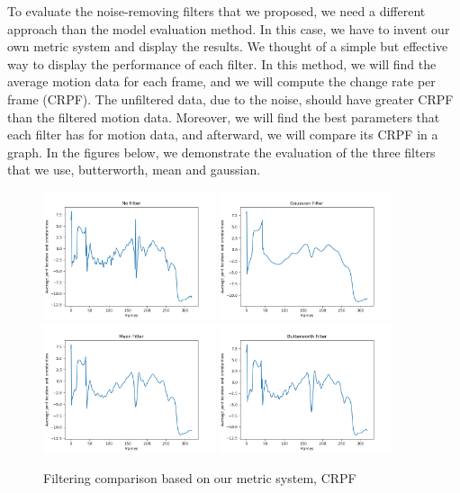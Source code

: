 To evaluate the noise-removing filters that we proposed, we need a different approach than the model evaluation method. In this case, we have to invent our own metric system and display the results. We thought of a simple but effective way to display the performance of each filter. In this method, we will find the average motion data for each frame, and we will compute the change rate per frame (CRPF). The unfiltered data, due to the noise, should have greater CRPF than the filtered motion data. Moreover, we will find the best parameters that each filter has for motion data, and afterward, we will compare its CRPF in a graph. In the figures below, we demonstrate the evaluation of the three filters that we use, butterworth, mean and gaussian.


\begin{figure}[htp]
    \centering
    \includegraphics[width=0.45\textwidth]{figures/Evaluation/no_filter.png}%
    \qquad
    \includegraphics[width=0.45\textwidth]{figures/Evaluation/Gaussian_1000_3000.png}%
    \qquad
    \includegraphics[width=0.45\textwidth]{figures/Evaluation/mean_7.png}%
    \qquad
    \includegraphics[width=0.45\textwidth]{figures/Evaluation/butterworth.png}%
    \captionsetup{labelformat=empty}
    \caption{Filtering comparison based on our metric system, CRPF}%
\end{figure}

